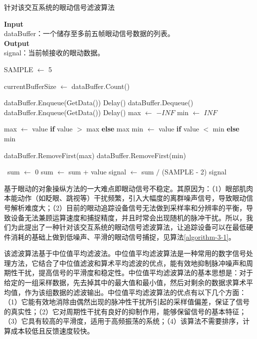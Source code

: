 \begin{algorithm}[t!]
    \caption{针对该交互系统的眼动信号滤波算法}
    \vspace{2mm}
    \textbf{Input} \\ dataBuffer：一个储存至多前五帧眼动信号数据的列表。 \\
    \textbf{Output} \\ signal：当前帧接收的眼动数据。
    \vspace{2mm}
    
	\begin{algorithmic}[1]	
		
        \State SAMPLE $\leftarrow$ 5
        
        \State currentBufferSize $\leftarrow$ dataBuffer.Count()

            \State dataBuffer.Enqueue(GetData())
            \State Delay()
        \EndFor
        \Else
        \State dataBuffer.Dequeue()
        \State dataBuffer.Enqueue(GetData())
        \State Delay()
        \EndIf
        \State
        \State max $\leftarrow$ $-INF$
        \State min $\leftarrow$ $INF$
        
            \State max $\leftarrow$ value \textbf{if} value $>$ max \textbf{else} max
            \State min $\leftarrow$ value \textbf{if} value $<$ min \textbf{else} min
        \EndFor

        \State dataBuffer.RemoveFirst(max)
        \State dataBuffer.RemoveFirst(min)

        \
        \State sum $\leftarrow$ 0
            \State sum $\leftarrow$ sum + value
        \EndFor
        \State signal $\leftarrow$ sum $/$ (SAMPLE - 2)
        \State \Return signal
	\end{algorithmic} 
	\label{algorithm-3-1}
\end{algorithm} 

基于眼动的对象操纵方法的一大难点即眼动信号不稳定。其原因为：（1）眼部肌肉本能动作（如眨眼、跳视等）干扰频繁，引入大幅度的离群噪声信号，导致眼动信号解析难度大；（2）目前的眼动追踪设备信号无法做到采样率和分辨率的平衡，导致设备无法兼顾运算速度和捕捉精度，并且时常会出现随机的脉冲干扰。所以，我们为此提出了一种针对该交互系统的眼动信号滤波算法，让追踪设备可以在最低硬件消耗的基础上做到低噪声、平滑的眼动信号捕捉，见算法\ref{algorithm-3-1}。

该滤波算法基于中位值平均滤波法。中位值平均滤波算法是一种常用的数字信号处理方法，它结合了中位值滤波和算术平均滤波的优点，能有效地抑制脉冲噪声和周期性干扰，提高信号的平滑度和稳定性。中位值平均滤波算法的基本思想是：对于给定的一组采样数据，先去掉其中的最大值和最小值，然后对剩余的数据求算术平均值，作为该组数据的滤波输出。中位值平均滤波算法的优点有以下几个方面：（1）它能有效地消除由偶然出现的脉冲性干扰所引起的采样值偏差，保证了信号的真实性；（2）它对周期性干扰有良好的抑制作用，能够保留信号的基本特征；（3）它具有较高的平滑度，适用于高频振荡的系统；（4）该算法不需要排序，计算成本较低且反馈速度较快。

